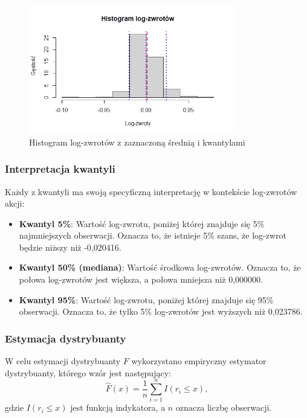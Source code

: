 \documentclass[a4paper,11pt]{article}
\begin{document}
\begin{figure}[H]
    \centering
    \includegraphics[width=0.8\textwidth]{./Wojtek/histogram-log-zwrotow.png}
    \caption{Histogram log-zwrotów z zaznaczoną średnią i kwantylami}
    \label{fig:histogram_log_zwrotow}
\end{figure}

\subsubsection{Interpretacja kwantyli}
Każdy z kwantyli ma swoją specyficzną interpretację w kontekście log-zwrotów akcji:
\begin{itemize}
    \item \textbf{Kwantyl 5\%}: Wartość log-zwrotu, poniżej której znajduje się 5\% najmniejszych obserwacji. Oznacza to, że istnieje 5\% szans, że log-zwrot będzie niższy niż -0,020416.
    \item \textbf{Kwantyl 50\% (mediana)}: Wartość środkowa log-zwrotów. Oznacza to, że połowa log-zwrotów jest większa, a połowa mniejsza niż 0,000000.
    \item \textbf{Kwantyl 95\%}: Wartość log-zwrotu, poniżej której znajduje się 95\% obserwacji. Oznacza to, że tylko 5\% log-zwrotów jest wyższych niż 0,023786.
\end{itemize}

\subsubsection{Estymacja dystrybuanty}
W celu estymacji dystrybuanty $F$ wykorzystano empiryczny estymator dystrybuanty, którego wzór jest następujący:
\begin{equation}
    \hat{F}(x) = \frac{1}{n} \sum_{i=1}^{n} I(r_i \leq x),
\end{equation}
 gdzie $I(r_i \leq x)$ jest funkcją indykatora, a $n$ oznacza liczbę obserwacji.
\end{document}
